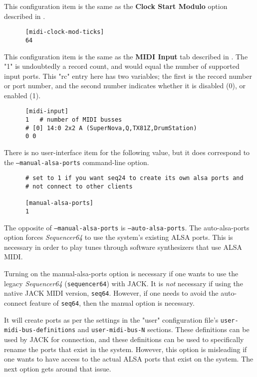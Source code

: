    This configuration item is the same as the
   \textbf{Clock Start Modulo} option described in
   .

   \begin{verbatim}
      [midi-clock-mod-ticks]
      64
   \end{verbatim}

   This configuration item is the same as the 
   \textbf{MIDI Input} tab described in
   .
   The "1" is undoubtedly a record count, and would equal the number of
   supported input ports.
   This "rc" entry here has two variables; the first is the record number or
   port number, and the second number indicates whether it is disabled (0),
   or enabled (1).

   \begin{verbatim}
      [midi-input]
      1   # number of MIDI busses
      # [0] 14:0 2x2 A (SuperNova,Q,TX81Z,DrumStation)
      0 0
   \end{verbatim}

   There is no user-interface item for the following value, but
   it does correspond to the \texttt{--manual-alsa-ports} command-line
   option.

   \begin{verbatim}
      # set to 1 if you want seq24 to create its own alsa ports and
      # not connect to other clients

      [manual-alsa-ports]
      1
   \end{verbatim}

   The opposite of \texttt{--manual-alsa-ports}
   is \texttt{--auto-alsa-ports}.  The auto-alsa-ports option
   forces \textsl{Sequencer64} to use the system's existing ALSA ports.
   This is necessary in order to play tunes through software synthesizers that
   use ALSA MIDI.

   Turning on the manual-alsa-ports option is necessary if one
   wants to use the legacy \textsl{Sequencer64} (\texttt{sequencer64})
   with JACK.
   It is \textsl{not} necessary if using the native JACK MIDI version,
   \texttt{seq64}.
   However, if one needs to avoid the auto-connect feature of \texttt{seq64},
   then the manual option is necessary.

   It will create ports as per the settings in the "user" configuration file's
   \texttt{user-midi-bus-definitions} and \texttt{user-midi-bus-N} sections.
   These definitions can be used by JACK for connection, and these definitions
   can be used to specifically rename the ports that exist in the system.
   However, this option is misleading if one wants to have access to the
   actual ALSA ports that exist on the system.
   The next option gets around that issue.

